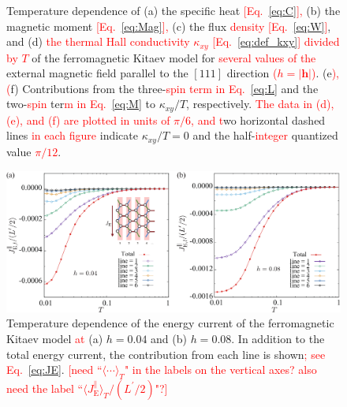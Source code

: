 \documentclass[twocolumn,superscriptaddress,showpacs, longbibliography, aps, prb]{revtex4-2}
\newcommand{\red}[1]{\textcolor{red}{#1}}
\newcommand{\blue}[1]{\textcolor{blue}{#1}}
\begin{document}
\begin{figure}
\begin{center}
  \end{center}
  \caption{Temperature dependence of (a) the specific heat \red{[Eq.~\eqref{eq:C}],} (b) the magnetic moment \red{[Eq.~\eqref{eq:Mag}],} (c) the flux \red{density [Eq.~\eqref{eq:W}]}, and (d) \red{the thermal Hall conductivity $\kappa_{xy}$ [Eq.~\eqref{eq:def_kxy}] divided by $T$} %
of the ferromagnetic Kitaev model for %
\red{several values of the} external magnetic field parallel to the $[111]$ direction \red{($h=|\bm{h}|$)}. (e\red{), (}f) Contributions from the three-\red{spin term in Eq.~\eqref{eq:L}} %
and the two-\red{spin} %
ter\red{m %
in Eq.~\eqref{eq:M}} 
to $\kappa_{xy}/T$, respectively. \red{The data in (d), (e), and (f) are plotted in units of $\pi/6$, and %
t}wo horizontal dashed lines \red{in each figure} indicate $\kappa_{xy}/T = 0$ and the half-\red{integer} quantized value \red{$\pi/12$}.
  }
  \label{fig:CMF_pure}
\end{figure}



\begin{figure}[htb]
  \begin{center}
    \includegraphics[width=0.9\linewidth]{Figs/J_line_all.pdf}
  \end{center}
  \caption{Temperature dependence of the energy current of the ferromagnetic Kitaev model %
\red{at} (a) $h=0.04$ and (b) $h=0.08$. In addition to the total energy current, the contribution from each line is shown\red{; see Eq.~\eqref{eq:JE}}.
\red{[need ``$\langle \cdots \rangle_T$" in the labels on the vertical axes? also need the label ``$\langle J_{\mathrm{E}}^\parallel \rangle_T/(L^\prime/2)$"?]} 
}
  \label{fig:J_line}
\end{figure}
\end{document}
